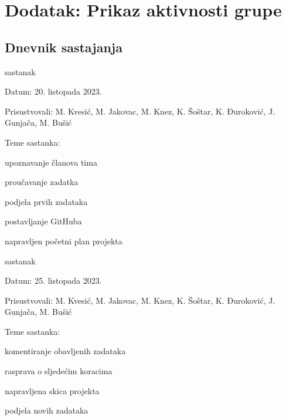 \chapter*{Dodatak: Prikaz aktivnosti grupe}
		
		\section*{Dnevnik sastajanja}
		
		\begin{packed_enum}
			\item  sastanak
			
			\item[] \begin{packed_item}
				\item Datum: 20. listopada 2023.
				\item Prisustvovali: M. Kvesić, M. Jakovac, M. Knez, K. Šoštar, K. Đuroković, J. Gunjača, M. Bušić
				\item Teme sastanka:
				\begin{packed_item}
					\item  upoznavanje članova tima
					\item  proučavanje zadatka
					\item  podjela prvih zadataka
					\item  postavljanje GitHuba 
					\item  napravljen početni plan projekta
				\end{packed_item}
			\end{packed_item}
			
			\item  sastanak
			\item[] \begin{packed_item}
				\item Datum: 25. listopada 2023.
				\item Prisustvovali: M. Kvesić, M. Jakovac, M. Knez, K. Šoštar, K. Đuroković, J. Gunjača, M. Bušić
				\item Teme sastanka:
				\begin{packed_item}
					\item  komentiranje obavljenih zadataka
					\item  rasprava o sljedećim koracima
					\item  napravljena skica projekta
					\item  podjela novih zadataka
				\end{packed_item}
			\end{packed_item}
			

\end{packed_enum}
